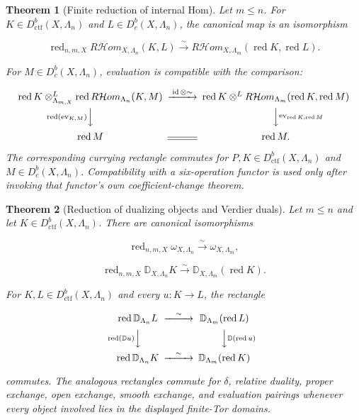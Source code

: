 \documentclass[10pt]{article}
\newtheorem{theorem}{Theorem}[section]
\theoremstyle{definition}
\newcommand{\Dbc}{D^b_c}
\newcommand{\Dctf}{D^b_{\mathrm{ctf}}}
\newcommand{\RHom}{R\mathcal Hom}
\newcommand{\red}{\operatorname{red}}
\newcommand{\DD}{\mathbb D}
\begin{document}
\begin{theorem}[Finite reduction of internal Hom]
Let \(m\leq n\).  For \(K\in\Dctf(X,\Lambda_n)\) and
\(L\in\Dbc(X,\Lambda_n)\), the canonical map is an isomorphism

\[
 \red_{n,m,X}\RHom_{X,\Lambda_n}(K,L)
 \xrightarrow{\sim}
 \RHom_{X,\Lambda_m}(\red K,\red L).
\]

For \(M\in\Dbc(X,\Lambda_n)\), evaluation is compatible with the comparison:

\[
\begin{CD}
\red K\otimes^L_{\Lambda_{m,X}}\red\RHom_{\Lambda_n}(K,M)
 @>{\operatorname{id}\otimes\sim}>>
\red K\otimes^L\RHom_{\Lambda_m}(\red K,\red M)\\
@V{\red(\operatorname{ev}_{K,M})}VV
 @VV{\operatorname{ev}_{\red K,\red M}}V\\
\red M @= \red M.
\end{CD}
\]

The corresponding currying rectangle commutes for
\(P,K\in\Dctf(X,\Lambda_n)\) and \(M\in\Dbc(X,\Lambda_n)\).  Compatibility
with a six-operation functor is used only after invoking that functor's own
coefficient-change theorem.
\end{theorem}

\begin{theorem}[Reduction of dualizing objects and Verdier duals]
Let \(m\leq n\) and let \(K\in\Dctf(X,\Lambda_n)\).  
There are canonical isomorphisms

\[
 \red_{n,m,X}\omega_{X,\Lambda_n}
 \xrightarrow{\sim}\omega_{X,\Lambda_m},
\]

\[
 \red_{n,m,X}\DD_{X,\Lambda_n}K
 \xrightarrow{\sim}\DD_{X,\Lambda_m}(\red K).
\]

For \(K,L\in\Dctf(X,\Lambda_n)\) and every \(u:K\to L\), the rectangle

\[
\begin{CD}
\red\DD_{\Lambda_n}L @>{\sim}>> \DD_{\Lambda_m}(\red L)\\
@V{\red(\DD u)}VV @VV{\DD(\red u)}V\\
\red\DD_{\Lambda_n}K @>{\sim}>> \DD_{\Lambda_m}(\red K)
\end{CD}
\]

commutes.  The analogous rectangles commute for \(\delta\), relative
duality, proper exchange, open exchange, smooth exchange, and evaluation
pairings whenever every object involved lies in the displayed finite-Tor
domains.
\end{theorem}
\end{document}
